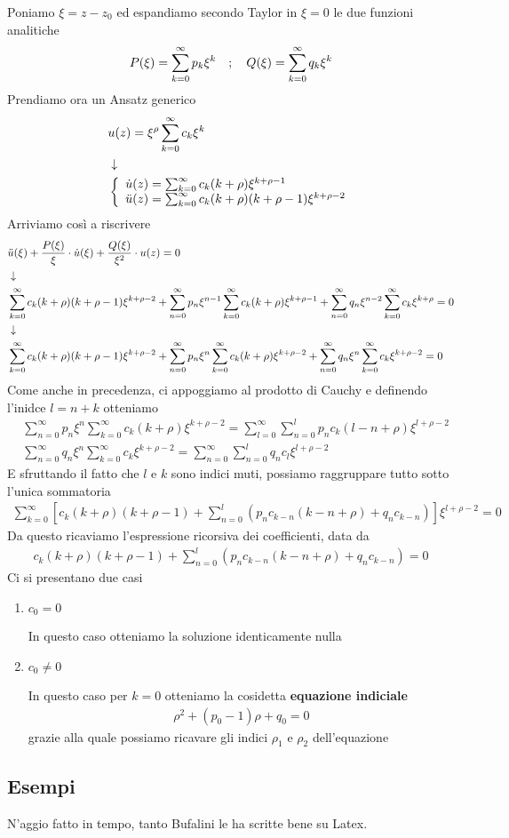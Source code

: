 Poniamo $\xi = z-z_0$ ed espandiamo secondo Taylor in $\xi = 0$ le due funzioni analitiche
\begin{align}
	P(\xi) = \sum_{k = 0}^{\infty} p_k \xi^k \quad ; \quad Q(\xi) = \sum_{k = 0}^{\infty} q_k \xi^k
\end{align}
Prendiamo ora un Ansatz generico
\begin{align}
	&u(z) = \xi^\rho \sum_{k=0}^{\infty} c_k \xi^k \firstpassage
	&\double{\dot{u}(z) = \sum_{k=0}^{\infty} c_k (k+\rho)\xi^{k+\rho-1}\hfill}{\ddot{u}(z) = \sum_{k=0}^{\infty} c_k (k+\rho)(k+\rho-1)\xi^{k+\rho-2}}
\end{align}
Arriviamo così a riscrivere
\begin{align}
	&\ddot{u}(\xi) + \frac{P(\xi)}{\xi} \cdot \dot{u}(\xi) + \frac{Q(\xi)}{\xi^2} \cdot u(z) = 0 \\ &\downarrow \nonumber \\
	&\sum_{k=0}^{\infty} c_k (k+\rho)(k+\rho-1)\xi^{k+\rho-2} + \sum_{n = 0}^{\infty} p_n \xi^{n-1} \sum_{k=0}^{\infty} c_k (k+\rho)\xi^{k+\rho-1} + \sum_{n = 0}^{\infty} q_n \xi^{n-2}\sum_{k=0}^{\infty} c_k \xi^{k+\rho} = 0 \nonumber \\ &\downarrow \nonumber \\
	&\sum_{k=0}^{\infty} c_k (k+\rho)(k+\rho-1)\xi^{k+\rho-2} + \sum_{n = 0}^{\infty} p_n \xi^n \sum_{k = 0}^{\infty} c_k (k+\rho)\xi^{k+\rho -2} + \sum_{n = 0}^{\infty} q_n \xi^n \sum_{k = 0}^{\infty} c_k \xi^{k+\rho -2} = 0
\end{align}
\newpage
Come anche in precedenza, ci appoggiamo al prodotto di Cauchy e definendo l'inidce $l = n+k$ otteniamo
\begin{align}
	&\sum_{n = 0}^{\infty} p_n \xi^n \sum_{k = 0}^{\infty} c_k (k+\rho)\xi^{k+\rho -2} = \sum_{l = 0}^{\infty} \sum_{n = 0}^{l} p_n c_k (l-n+\rho)\xi^{l+\rho -2}\\
	&\sum_{n = 0}^{\infty} q_n \xi^n \sum_{k = 0}^{\infty} c_k \xi^{k+\rho -2} = \sum_{n = 0}^{\infty}\sum_{n = 0}^{l} q_n c_l \xi^{l+\rho -2}
\end{align}
E sfruttando il fatto che $l$ e $k$ sono indici muti, possiamo raggruppare tutto sotto l'unica sommatoria
\begin{align}
	\sum_{k = 0}^\infty \left[ c_k (k+\rho)(k+\rho-1) + \sum_{n = 0}^{l} \left( p_n c_{k-n} (k-n+\rho) + q_n c_{k-n} \right) \right] \xi^{l+\rho -2} = 0
\end{align}
Da questo ricaviamo l'espressione ricorsiva dei coefficienti, data da
\begin{align}
	c_k (k+\rho)(k+\rho-1) + \sum_{n = 0}^{l} \left( p_n c_{k-n} (k-n+\rho) + q_n c_{k-n} \right) = 0
\end{align}
Ci si presentano due casi
\begin{enumerate}
	\item $c_0 = 0$
	
	In questo caso otteniamo la soluzione identicamente nulla
	\item $c_0 \neq 0$
	
	In questo caso per $k=0$ otteniamo la cosidetta \textbf{equazione indiciale}
	\begin{align}
		\rho^2 + (p_0 -1)\rho + q_0 = 0
	\end{align}
	grazie alla quale possiamo ricavare gli indici $\rho_1$ e $\rho_2$ dell'equazione 
\end{enumerate}

\newpage

\subsection{Esempi}
N'aggio fatto in tempo, tanto Bufalini le ha scritte bene su Latex.